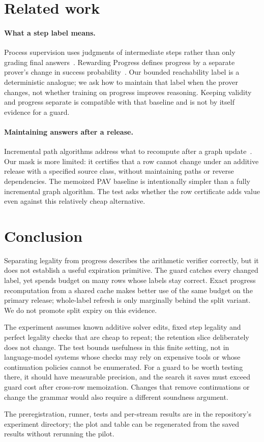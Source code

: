 \section{Related work}

\paragraph{What a step label means.}
Process supervision uses judgments of intermediate steps rather than
only grading final answers~\citep{lightman2023verify}. Rewarding Progress
defines progress by a separate prover's change in success
probability~\citep{setlur2024rewarding}. Our bounded reachability
label is a deterministic analogue; we ask how to maintain that label
when the prover changes, not whether training on progress improves
reasoning. Keeping validity and progress separate is compatible with
that baseline and is not by itself evidence for a guard.

\paragraph{Maintaining answers after a release.}
Incremental path algorithms address what to recompute after a graph
update~\citep{ramalingam1996incremental}. Our mask is more limited: it
certifies that a row cannot change under an additive release with a
specified source class, without maintaining paths or reverse dependencies.
The memoized PAV baseline is intentionally simpler than a fully
incremental graph algorithm. The test asks whether the row certificate
adds value even against this relatively cheap alternative.

\section{Conclusion}

Separating legality from progress describes the arithmetic verifier
correctly, but it does not establish a useful expiration primitive.
The guard catches every changed label, yet spends budget on many rows
whose labels stay correct. Exact progress recomputation from a shared
cache makes better use of the same budget on the primary release;
whole-label refresh is only marginally behind the split variant.
We do not promote split expiry on this evidence.

The experiment assumes known additive solver edits, fixed step legality
and perfect legality checks that are cheap to repeat; the retention
slice deliberately does not change. The test bounds usefulness in this
finite setting, not in language-model systems whose checks may rely on
expensive tools or whose continuation policies cannot be enumerated.
For a guard to be worth testing there, it should have measurable
precision, and the search it saves must exceed guard cost after
cross-row memoization. Changes that remove continuations or change
the grammar would also require a different soundness argument.

The preregistration, runner, tests and per-stream results are in the
repository's experiment directory; the plot and table can be regenerated
from the saved results without rerunning the pilot.
